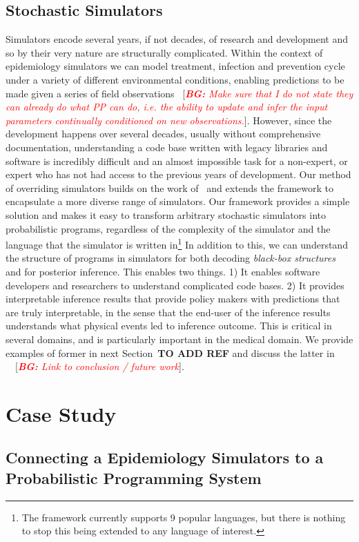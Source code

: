 \documentclass{article}
\newcommand{\bg}[1]{~{{[{\it \textcolor{red}{{\bf BG:} #1}}]}}}
\begin{document}
\subsection{Stochastic Simulators}

Simulators encode several years, if not decades, of research and development and so by their very nature are structurally complicated. 
Within the context of epidemiology simulators we can model treatment, infection and prevention cycle under a variety of different environmental conditions, enabling predictions to be made given a series of field observations \bg{Make sure that I do not state they can already do what PP can do, i.e. the ability to update and infer the input parameters continually conditioned on new observations.}. 
However, since the development happens over several decades, usually without comprehensive documentation, understanding a code base written with legacy libraries and software is incredibly difficult and an almost impossible task for a non-expert, or expert who has not had access to the previous years of development. 
Our method of overriding simulators builds on the work of~\cite{baydin2018efficient} and extends the framework to encapsulate a more diverse range of simulators. 
Our framework provides a simple solution and makes it easy to transform arbitrary stochastic simulators into probabilistic programs, regardless of the complexity of the simulator and the language that the simulator is written in\footnote{The framework currently supports 9 popular languages, but there is nothing to stop this being extended to any language of interest.}
In addition to this, we can understand the structure of programs in simulators for both decoding \emph{black-box structures} and for posterior inference. 
This enables two things. 1) It enables software developers and researchers to understand complicated code bases. 
2) It provides interpretable inference results that provide policy makers with predictions that are truly interpretable, in the sense that the end-user of the inference results understands what physical events led to inference outcome. 
This is critical in several domains, and is particularly important in the medical domain. 
We provide examples of former in next Section~\textbf{TO ADD REF} and discuss the latter in ~\bg{Link to conclusion / future work}.


\section{Case Study}
\subsection{Connecting a Epidemiology Simulators to a Probabilistic Programming System}
\end{document}
